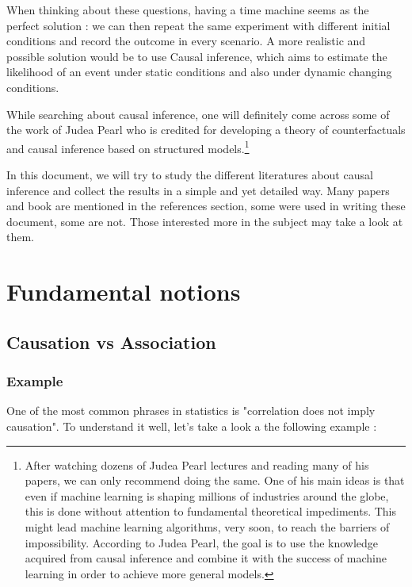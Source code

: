 \documentclass{article}
\begin{document}
When thinking about these questions, having a time machine seems as the perfect solution : we can then repeat the same experiment with different initial conditions and record the outcome in every scenario. A more realistic and possible solution would be to use Causal inference, which aims to estimate the likelihood of an event under static conditions and also under dynamic changing conditions.

While searching about causal inference, one will definitely come across some of the work of Judea Pearl who is credited for developing a theory of counterfactuals and causal inference based on structured models.\footnote{After watching dozens of Judea Pearl lectures and reading many of his papers, we can only recommend doing the same. One of his main ideas is that even if machine learning is shaping millions of industries around the globe, this is done without attention to fundamental theoretical impediments. This might lead machine learning algorithms, very soon, to reach the barriers of impossibility. According to Judea Pearl, the goal is to use the knowledge acquired from causal inference and combine it with the success of machine learning in order to achieve more general models.}

In this document, we will try to study the different literatures about causal inference and collect the results in a simple and yet detailed way. Many papers and book are mentioned in the references section, some were used in writing these document, some are not. Those interested more in the subject may take a look at them.  


\newpage


\section{Fundamental notions}




\subsection{Causation vs Association}

	\subsubsection{Example}

One of the most common phrases in statistics is "correlation does not imply causation". To understand it well, let's take a look a the following example :
\end{document}
